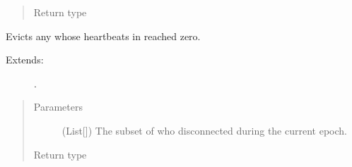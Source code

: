 \documentclass[letterpaper,10pt,english]{sphinxmanual}
\begin{document}
\begin{fulllineitems}
\begin{fulllineitems}
\begin{description}
\end{description}
\begin{quote}\begin{description}
\item[{Return type}] \leavevmode
{}

\end{description}\end{quote}

\end{fulllineitems}


\begin{fulllineitems}
\label{\detokenize{app.domain:app.domain.cluster_groups.HDFSCluster.maintain}}
Evicts any {\hyperref[\detokenize{app.domain:app.domain.network_nodes.HDFSNode}]{}}
whose heartbeats in {\hyperref[\detokenize{app.domain:app.domain.cluster_groups.HDFSCluster.data_node_heartbeats}]{}} reached zero.
\begin{description}
\item[{Extends:}] \leavevmode
{\hyperref[\detokenize{app.domain:app.domain.cluster_groups.Cluster.execute_epoch}]{}}.

\end{description}
\begin{quote}\begin{description}
\item[{Parameters}] \leavevmode
{} (List{[}{\hyperref[\detokenize{app:app.type_hints.NodeType}]{}}{]}) \textendash{} The subset of {\hyperref[\detokenize{app.domain:app.domain.cluster_groups.Cluster.members}]{}} who disconnected
during the current epoch.

\item[{Return type}] \leavevmode
{}

\end{description}\end{quote}


\end{fulllineitems}
\end{fulllineitems}
\end{document}
